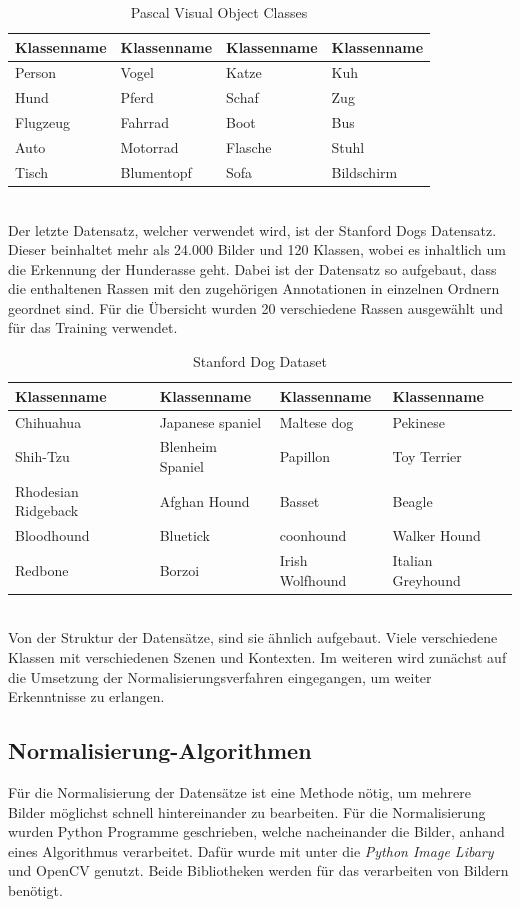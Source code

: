 \documentclass[a4paper,12pt,oneside]{article}
\begin{document}
\begin{table}
[h]
\caption{Pascal Visual Object Classes \cite{pascal-voc-2007}}
\centering
\begin{tabular}{|l|l|l|l|}
\hline
Klassenname & Klassenname & Klassenname & Klassenname\\
\hline
Person & Vogel & Katze & Kuh\\
Hund & Pferd & Schaf & Zug\\
Flugzeug & Fahrrad & Boot & Bus\\
Auto & Motorrad & Flasche & Stuhl\\
Tisch & Blumentopf & Sofa & Bildschirm\\
\hline
\end{tabular}
\label{tab:pvoc}
\end{table}\\
Der letzte Datensatz, welcher verwendet wird, ist der Stanford Dogs Datensatz. Dieser beinhaltet mehr als 24.000 Bilder und 120 Klassen, wobei es inhaltlich um die Erkennung der Hunderasse geht. Dabei ist der Datensatz so aufgebaut, dass die enthaltenen Rassen mit den zugehörigen Annotationen in einzelnen Ordnern geordnet sind. Für die Übersicht wurden 20 verschiedene Rassen ausgewählt und für das Training verwendet.\\
\begin{table}
[h]
\caption{Stanford Dog Dataset \cite{KhoslaYaoJayadevaprakashFeiFei_FGVC2011}}
\centering
\begin{tabular}{|l|l|l|l|}
\hline
Klassenname & Klassenname & Klassenname & Klassenname\\
\hline
Chihuahua & Japanese spaniel & Maltese dog & Pekinese\\
Shih-Tzu & Blenheim Spaniel & Papillon & Toy Terrier\\
Rhodesian Ridgeback & Afghan Hound & Basset & Beagle\\
Bloodhound & Bluetick & coonhound & Walker Hound\\
Redbone & Borzoi & Irish Wolfhound & Italian Greyhound\\
\hline
\end{tabular}
\end{table}\\
Von der Struktur der Datensätze, sind sie ähnlich aufgebaut. Viele verschiedene Klassen mit verschiedenen Szenen und Kontexten. Im weiteren wird zunächst auf die Umsetzung der Normalisierungsverfahren eingegangen, um weiter Erkenntnisse zu erlangen.
\newpage
\subsection{Normalisierung-Algorithmen}\label{s.nalgorithmen}
Für die Normalisierung der Datensätze ist eine Methode nötig, um mehrere Bilder möglichst schnell hintereinander zu bearbeiten. Für die Normalisierung wurden Python Programme geschrieben, welche nacheinander die Bilder, anhand eines Algorithmus verarbeitet. Dafür wurde mit unter die \textit{Python Image Libary} und OpenCV genutzt. Beide Bibliotheken werden für das verarbeiten von Bildern benötigt. 
\end{document}
